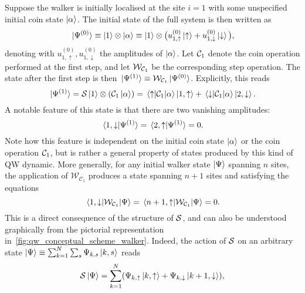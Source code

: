 Suppose the walker is initially localised at the site $i=1$ with some unspecified initial coin state $\ket\alpha$.
The initial state of the full system is then written as
\begin{equation}
    \ket*{\Psi^{(0)}} \equiv
    \ket1\otimes\ket\alpha \equiv
    \ket{1}\otimes \big(u^{(0)}_{1,\uparrow} \ket{\uparrow} +
    u^{(0)}_{1,\downarrow} \ket{\downarrow} \big),
\end{equation}
denoting with $u^{(0)}_{1,\uparrow},u^{(0)}_{1,\downarrow}$ the amplitudes of $\ket\alpha$.
Let ${\mathcal{C}}_1$ denote the coin operation performed at the first step,
and let ${\mathcal{W}}_{{\mathcal{C}}_1}$ be the corresponding step operation.
The state after the first step is then
$\ket*{\Psi^{(1)}} \equiv {\mathcal{W}}_{{\mathcal{C}}_1} \ket*{\Psi^{(0)}}$.
Explicitly, this reads
\begin{equation}
    \ket*{\Psi^{(1)}} =
    {\mathcal{S}} \ket1\otimes({\mathcal{C}}_1\ket\alpha) =
    \mel{\uparrow}{{\mathcal{C}}_1}{\alpha} \ket{1,\uparrow} +
    \mel{\downarrow}{{\mathcal{C}}_1}{\alpha} \ket{2,\downarrow}.
\end{equation}
A notable feature of this state is that there are two vanishing amplitudes:
\begin{equation}
    \braket*{1, \downarrow}{\Psi^{(1)}} = \braket*{2, \uparrow}{\Psi^{(1)}} = 0.
\end{equation}
Note how this feature is independent on the initial coin state $\ket\alpha$ or the coin operation ${\mathcal{C}}_1$, but is rather a general property of states produced by this kind of \ac{QW} dynamic.
More generally, for any initial walker state $\ket{\Psi}$ spanning $n$ sites, the application of $\mathcal W_{\mathcal C_1}$ produces a state spanning $n+1$ sites and satisfying the equations
\begin{equation}
	\mel{1, \downarrow}{\mathcal W_{\mathcal C_1}}{\Psi} =
	\mel{n+1, \uparrow}{\mathcal W_{\mathcal C_1}}{\Psi} = 0.
	\label{eq:qw_vanishing_endpoints}
\end{equation}
This is a direct consequence of the structure of ${\mathcal{S}}$, and can also be understood graphically from the pictorial representation in~\cref{fig:qw_conceptual_scheme_walker}.
Indeed, the action of ${\mathcal{S}}$ on an arbitrary state
$\ket\Psi\equiv\sum_{k=1}^N \sum_s \Psi_{k,s}\ket{k,s}$ reads
\begin{equation}
    {\mathcal{S}}\ket\Psi =
    \sum_{k=1}^N (\Psi_{k,\uparrow}\ket{k,\uparrow} + \Psi_{k,\downarrow}\ket{k+1,\downarrow}),
\end{equation}
